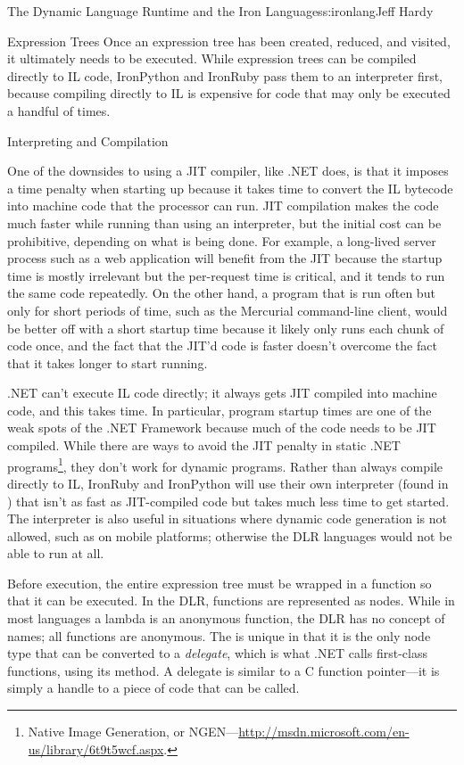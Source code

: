 \begin{aosachapter}{The Dynamic Language Runtime and the Iron Languages}{s:ironlang}{Jeff Hardy}
\begin{aosasect1}{Expression Trees}
Once an expression tree has been created, reduced, and visited, it ultimately
needs to be executed. While expression trees can be compiled directly to IL
code, IronPython and IronRuby pass them to an interpreter first, because
compiling directly to IL is expensive for code that may only be executed a
handful of times.

\end{aosasect1}

\begin{aosasect1}{Interpreting and Compilation}

One of the downsides to using a JIT compiler, like .NET does, is that it imposes
a time penalty when starting up because it takes time to convert the IL
bytecode into machine code that the processor can run. JIT compilation makes
the code much faster while running than using an interpreter, but the initial
cost can be prohibitive, depending on what is being done. For example, a
long-lived server process such as a web application will benefit from the JIT
because the startup time is mostly irrelevant but the per-request time is
critical, and it tends to run the same code repeatedly. On the other hand, a
program that is run often but only for short periods of time, such as the
Mercurial command-line client, would be better off with a short startup time
because it likely only runs each chunk of code once, and the fact that the JIT'd
code is faster doesn't overcome the fact that it takes longer to start running.

.NET can't execute IL code directly; it always gets JIT compiled into machine
code, and this takes time. In particular, program startup times are one of the
weak spots of the .NET Framework because much of the code needs to be JIT
compiled. While there are ways to avoid the JIT penalty in static .NET
programs\footnote{Native Image Generation, or
NGEN---\url{http://msdn.microsoft.com/en-us/library/6t9t5wcf.aspx}.}, they
don't work for dynamic programs. Rather than always compile directly to IL,
IronRuby and IronPython will use their own interpreter (found in
) that isn't as fast as JIT-compiled code
but takes much less time to get started. The interpreter is also useful in
situations where dynamic code generation is not allowed, such as on mobile
platforms; otherwise the DLR languages would not be able to run at all.

Before execution, the entire expression tree must be wrapped in a function so
that it can be executed. In the DLR, functions are represented as
 nodes. While in most languages a lambda is an anonymous
function, the DLR has no concept of names; all functions are anonymous. The
 is unique in that it is the only node type that can be
converted to a \emph{delegate}, which is what .NET calls first-class functions,
using its  method. A delegate is similar to a C function
pointer---it is simply a handle to a piece of code that can be called.


\end{aosasect1}
\end{aosachapter}
